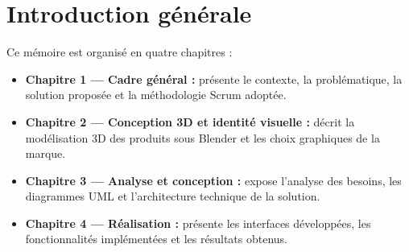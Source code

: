 \chapter*{Introduction générale}



\vspace{0.5cm}

\noindent Ce mémoire est organisé en quatre chapitres :

\begin{itemize}
  \item \textbf{Chapitre 1 — Cadre général :} présente le contexte, la problématique, la solution proposée et la méthodologie Scrum adoptée.
  \item \textbf{Chapitre 2 — Conception 3D et identité visuelle :} décrit la modélisation 3D des produits sous Blender et les choix graphiques de la marque.
  \item \textbf{Chapitre 3 — Analyse et conception :} expose l'analyse des besoins, les diagrammes UML et l'architecture technique de la solution.
  \item \textbf{Chapitre 4 — Réalisation :} présente les interfaces développées, les fonctionnalités implémentées et les résultats obtenus.
\end{itemize}
